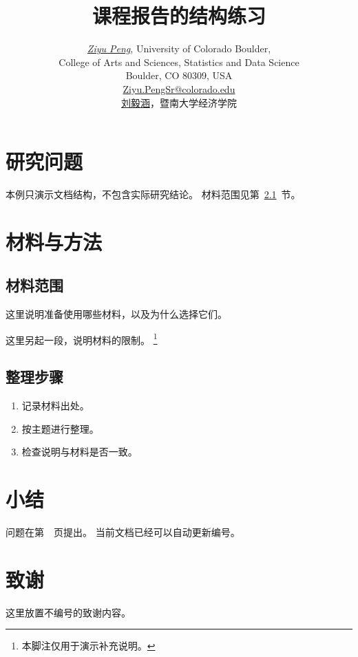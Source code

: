\documentclass[UTF8,a4paper,fontset=fandol]{ctexart}
\title{课程报告的结构练习}
\author{\href{https://github.com/pzy54154631-hub}{\textit{Ziyu Peng}}, University of Colorado Boulder,
  \\[0.1em]College of Arts and Sciences, Statistics and Data Science
  \\[0.1em]Boulder, CO 80309, USA
  \\[0.1em]\href{mailto:Ziyu.PengSr@colorado.edu}{Ziyu.PengSr@colorado.edu}
  \\[0.35em]
  \href{https://pzy54154631-hub.github.io/liuyihan/}{刘毅涵}，暨南大学经济学院}
\date{}
\begin{document}
\maketitle
\tableofcontents
\clearpage

\section{研究问题}
\label{sec:question}
本例只演示文档结构，不包含实际研究结论。
材料范围见第~\ref{sec:materials}~节。

\section{材料与方法}
\label{sec:methods}
\subsection{材料范围}
\label{sec:materials}
这里说明准备使用哪些材料，以及为什么选择它们。

这里另起一段，说明材料的限制。
\footnote{本脚注仅用于演示补充说明。}

\subsection{整理步骤}
\begin{enumerate}
  \item 记录材料出处。
  \item 按主题进行整理。
  \item 检查说明与材料是否一致。
\end{enumerate}

\section{小结}
问题在第~\pageref{sec:question}~页提出。
当前文档已经可以自动更新编号。

\section*{致谢}
{}
这里放置不编号的致谢内容。
\end{document}
